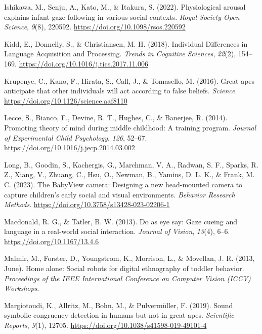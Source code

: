 \documentclass[
]{scrbook}
\newlength{\cslhangindent}
\newenvironment{CSLReferences}[2] %
 {\begin{list}{}{%
  \setlength{\itemindent}{0pt}
  \setlength{\leftmargin}{0pt}
  \setlength{\parsep}{0pt}
  \ifodd #1
   \setlength{\leftmargin}{\cslhangindent}
   \setlength{\itemindent}{-1\cslhangindent}
  \fi
  \setlength{\itemsep}{#2\baselineskip}}}
 {\end{list}}
\begin{document}
\begin{CSLReferences}{1}{0}
Ishikawa, M., Senju, A., Kato, M., \& Itakura, S. (2022). Physiological arousal explains infant gaze following in various social contexts. \emph{Royal Society Open Science}, \emph{9}(8), 220592. \url{https://doi.org/10.1098/rsos.220592}

Kidd, E., Donnelly, S., \& Christiansen, M. H. (2018). Individual {Differences} in {Language Acquisition} and {Processing}. \emph{Trends in Cognitive Sciences}, \emph{22}(2), 154--169. \url{https://doi.org/10.1016/j.tics.2017.11.006}

Krupenye, C., Kano, F., Hirata, S., Call, J., \& Tomasello, M. (2016). Great apes anticipate that other individuals will act according to false beliefs. \emph{Science}. \url{https://doi.org/10.1126/science.aaf8110}

Lecce, S., Bianco, F., Devine, R. T., Hughes, C., \& Banerjee, R. (2014). Promoting theory of mind during middle childhood: {A} training program. \emph{Journal of Experimental Child Psychology}, \emph{126}, 52--67. \url{https://doi.org/10.1016/j.jecp.2014.03.002}

Long, B., Goodin, S., Kachergis, G., Marchman, V. A., Radwan, S. F., Sparks, R. Z., Xiang, V., Zhuang, C., Hsu, O., Newman, B., Yamins, D. L. K., \& Frank, M. C. (2023). The {BabyView} camera: {Designing} a new head-mounted camera to capture children's early social and visual environments. \emph{Behavior Research Methods}. \url{https://doi.org/10.3758/s13428-023-02206-1}

Macdonald, R. G., \& Tatler, B. W. (2013). Do as eye say: {Gaze} cueing and language in a real-world social interaction. \emph{Journal of Vision}, \emph{13}(4), 6--6. \url{https://doi.org/10.1167/13.4.6}

Malmir, M., Forster, D., Youngstrom, K., Morrison, L., \& Movellan, J. R. (2013, June). Home alone: {Social} robots for digital ethnography of toddler behavior. \emph{Proceedings of the {IEEE} International Conference on Computer Vision ({ICCV}) Workshops}.

Margiotoudi, K., Allritz, M., Bohn, M., \& Pulvermüller, F. (2019). Sound symbolic congruency detection in humans but not in great apes. \emph{Scientific Reports}, \emph{9}(1), 12705. \url{https://doi.org/10.1038/s41598-019-49101-4}


\end{CSLReferences}
\end{document}
